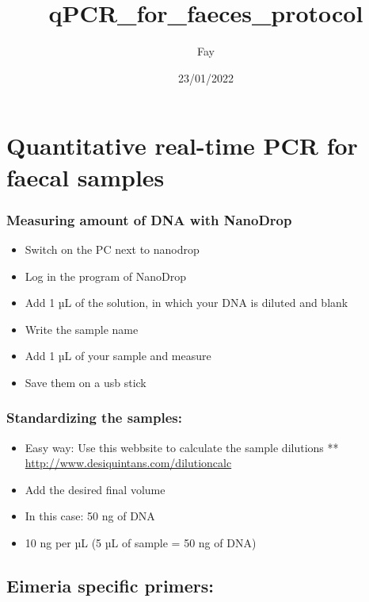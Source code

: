 \documentclass[
]{article}
\title{qPCR\_for\_faeces\_protocol}
\author{Fay}
\date{23/01/2022}
\providecommand{\tightlist}{%
  \setlength{\itemsep}{0pt}\setlength{\parskip}{0pt}}
\begin{document}
\maketitle

\hypertarget{quantitative-real-time-pcr-for-faecal-samples}{%
\section{Quantitative real-time PCR for faecal
samples}\label{quantitative-real-time-pcr-for-faecal-samples}}

\hypertarget{measuring-amount-of-dna-with-nanodrop}{%
\subsubsection{Measuring amount of DNA with
NanoDrop}\label{measuring-amount-of-dna-with-nanodrop}}

\begin{itemize}
\tightlist
\item
  Switch on the PC next to nanodrop
\item
  Log in the program of NanoDrop
\item
  Add 1 µL of the solution, in which your DNA is diluted and blank
\item
  Write the sample name
\item
  Add 1 µL of your sample and measure
\item
  Save them on a usb stick
\end{itemize}

\hypertarget{standardizing-the-samples}{%
\subsubsection{Standardizing the
samples:}\label{standardizing-the-samples}}

\begin{itemize}
\tightlist
\item
  Easy way: Use this webbsite to calculate the sample dilutions **
  \url{http://www.desiquintans.com/dilutioncalc}
\item
  Add the desired final volume
\item
  In this case: 50 ng of DNA
\item
  10 ng per µL (5 µL of sample = 50 ng of DNA)
\end{itemize}

\hypertarget{eimeria-specific-primers}{%
\subsection{Eimeria specific primers:}\label{eimeria-specific-primers}}
\end{document}
